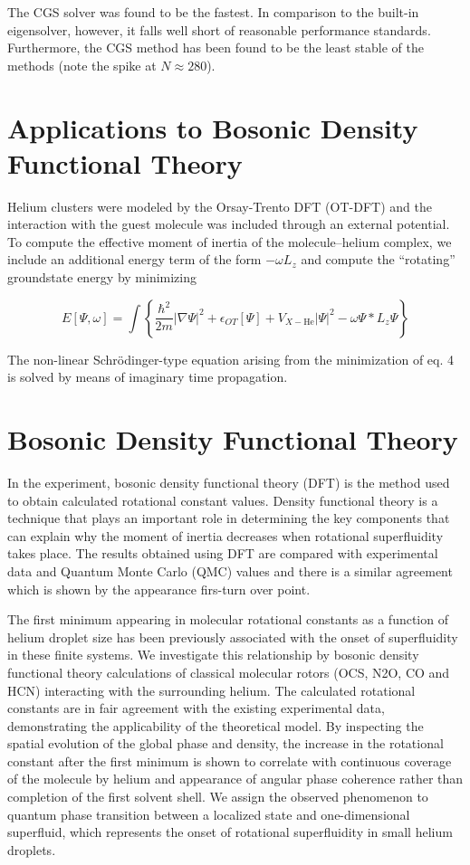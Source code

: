 \documentclass[12pt,]{book}
\begin{document}
The CGS solver was found to be the fastest. In comparison to the
built-in eigensolver, however, it falls well short of reasonable
performance standards. Furthermore, the CGS method has been found to be
the least stable of the methods (note the spike at \(N\approx 280\)).

\pagebreak

\section*{Applications to Bosonic Density Functional Theory}

Helium clusters were modeled by the Orsay-Trento DFT (OT-DFT) and the
interaction with the guest molecule was included through an external
potential. To compute the effective moment of inertia of the
molecule--helium complex, we include an additional energy term of the
form \(-\omega L_z\) and compute the ``rotating'' groundstate energy by
minimizing

\begin{equation}
\label{eq:OTDFT}
E[\Psi,\omega]=\int\left\{\frac{\hbar^2}{2m}\rvert\nabla\Psi\rvert^2+\epsilon_{OT}[\Psi]+V_{X-\text{He}}\rvert\Psi\rvert^2-\omega \Psi*L_z\Psi\right\}
\end{equation}

The non-linear Schrödinger-type equation arising from the minimization
of eq. 4 is solved by means of imaginary time propagation.

\section*{Bosonic Density Functional Theory}

In the experiment, bosonic density functional theory (DFT) is the method
used to obtain calculated rotational constant values. Density functional
theory is a technique that plays an important role in determining the
key components that can explain why the moment of inertia decreases when
rotational superfluidity takes place. The results obtained using DFT are
compared with experimental data and Quantum Monte Carlo (QMC) values and
there is a similar agreement which is shown by the appearance firs-turn
over point.

The first minimum appearing in molecular rotational constants as a
function of helium droplet size has been previously associated with the
onset of superfluidity in these finite systems. We investigate this
relationship by bosonic density functional theory calculations of
classical molecular rotors (OCS, N2O, CO and HCN) interacting with the
surrounding helium. The calculated rotational constants are in fair
agreement with the existing experimental data, demonstrating the
applicability of the theoretical model. By inspecting the spatial
evolution of the global phase and density, the increase in the
rotational constant after the first minimum is shown to correlate with
continuous coverage of the molecule by helium and appearance of angular
phase coherence rather than completion of the first solvent shell. We
assign the observed phenomenon to quantum phase transition between a
localized state and one-dimensional superfluid, which represents the
onset of rotational superfluidity in small helium droplets. \appendix
\end{document}
